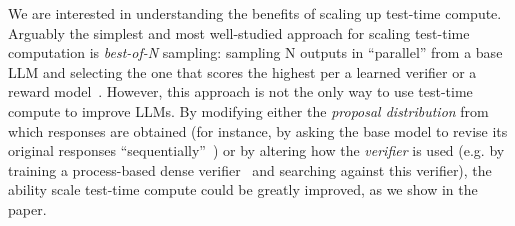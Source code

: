 \documentclass[11pt, letterpaper, logo]{googledeepmind}
\begin{document}
We are interested in understanding the benefits of scaling up test-time compute. Arguably the simplest and most well-studied approach for scaling test-time computation is \emph{best-of-N} sampling: sampling N outputs in ``parallel'' from a  base LLM and selecting the one that scores the highest per a learned verifier or a reward model~\citep{cobbe2021training,lightman2023lets}. However, this approach is not the only way to use test-time compute to improve LLMs. By modifying either the \emph{proposal distribution} from which responses are obtained (for instance, by asking the base model to revise its original responses ``sequentially''~\citep{qu2024recursive}) or by altering how the \emph{verifier} is used (e.g. by training a process-based dense verifier~\citep{lightman2023lets,wang2023mathshepherd} and searching against this verifier), the ability scale test-time compute could be greatly improved, as we show in the paper. 
\end{document}
